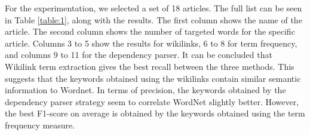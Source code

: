 \documentclass[oribibl]{llncs}
\begin{document}
For the experimentation, we selected a set of 18 articles. The full list can be seen in Table \ref{table:1}, along with the results. The first column shows the name of the article. The second column shows the number of targeted words for the specific article. Columns 3 to 5 show the results for wikilinks, 6 to 8 for term frequency, and columns 9 to 11 for the dependency parser. It can be concluded that Wikilink term extraction gives the best recall between the three methods. This suggests that the keywords obtained using the wikilinks contain similar semantic information to  Wordnet. In terms of precision, the keywords obtained by the dependency parser strategy seem to correlate WordNet slightly better. However, the best F1-score on average is obtained by the keywords obtained using the term frequency measure.    
\end{document}
